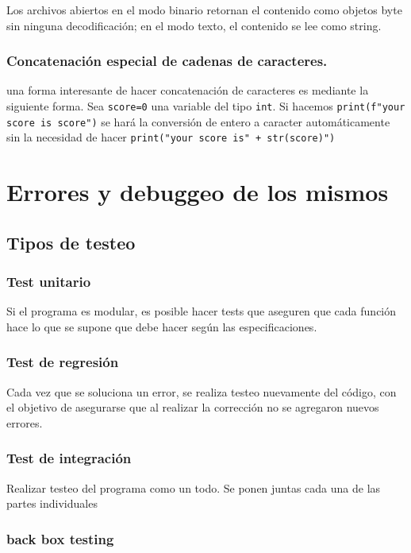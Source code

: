 Los archivos abiertos en el modo binario retornan el contenido como objetos
byte sin ninguna decodificación; en el modo texto, el contenido se lee como
string.

\subsubsection{Concatenación especial de cadenas de caracteres.}

una forma interesante de hacer concatenación de caracteres es mediante la
siguiente forma. Sea \texttt{score=0} una variable del tipo \texttt{int}. Si
hacemos \texttt{print(f"your score is {score}")} se hará la conversión de
entero a caracter automáticamente sin la necesidad de hacer \texttt{print("your
    score is" + str(score)")}

\section{Errores y debuggeo de los mismos}

\subsection{Tipos de testeo}

\subsubsection{Test unitario}

Si el programa es modular, es posible hacer tests que aseguren que cada función
hace lo que se supone que debe hacer según las especificaciones.

\subsubsection*{Test de regresión}

Cada vez que se soluciona un error, se realiza testeo nuevamente del código,
con el objetivo de asegurarse que al realizar la corrección no se agregaron
nuevos errores.

\subsubsection*{Test de integración}

Realizar testeo del programa como un todo. Se ponen juntas cada una de las
partes individuales

\subsubsection{back box testing}

